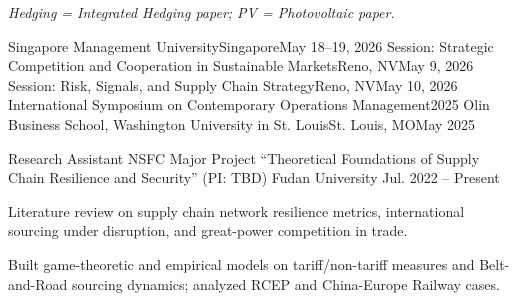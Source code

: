 \documentclass[11pt, letterpaper]{awesome-cv}
\begin{document}
\textit{Hedging = Integrated Hedging paper; PV = Photovoltaic paper.}
\begin{cventries}
    {Singapore Management University}{Singapore}{May 18--19, 2026}{}
    {Session: Strategic Competition and Cooperation in Sustainable Markets}{Reno, NV}{May 9, 2026}{}
    {Session: Risk, Signals, and Supply Chain Strategy}{Reno, NV}{May 10, 2026}{}
    {International Symposium on Contemporary Operations Management}{}{2025}{}
    {Olin Business School, Washington University in St. Louis}{St. Louis, MO}{May 2025}{}
\end{cventries}

\begin{cventries}
  \cventry
    {Research Assistant}
    {NSFC Major Project ``Theoretical Foundations of Supply Chain Resilience and Security'' (PI: TBD)}
    {Fudan University}
    {Jul. 2022 -- Present}
    {
      \begin{cvitems}
        \item {Literature review on supply chain network resilience metrics, international sourcing under disruption, and great-power competition in trade.}
        \item {Built game-theoretic and empirical models on tariff/non-tariff measures and Belt-and-Road sourcing dynamics; analyzed RCEP and China-Europe Railway cases.}
      \end{cvitems}
    }

\end{cventries}
\end{document}
